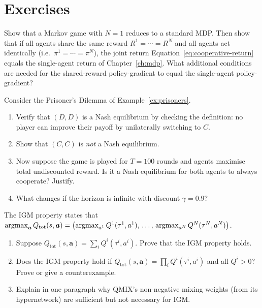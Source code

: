 \section*{Exercises}

\begin{exercise}
\label{ex:markov-game-reduction}
Show that a Markov game with $N=1$ reduces to a standard MDP.
Then show that if all agents share the same reward $R^1 = \cdots =
R^N$ and all agents act identically (i.e.\ $\pi^1 = \cdots = \pi^N$),
the joint return Equation~\eqref{eq:cooperative-return} equals the
single-agent return of Chapter~\ref{ch:mdp}. What additional
conditions are needed for the shared-reward policy-gradient to equal
the single-agent policy-gradient?
\end{exercise}

\begin{exercise}
\label{ex:nash-prisoners}
Consider the Prisoner's Dilemma of Example~\ref{ex:prisoners}.
\begin{enumerate}[label=(\alph*)]
  \item Verify that $(D, D)$ is a Nash equilibrium by checking the
    definition: no player can improve their payoff by unilaterally
    switching to $C$.
  \item Show that $(C, C)$ is \emph{not} a Nash equilibrium.
  \item Now suppose the game is played for $T = 100$ rounds and
    agents maximise total undiscounted reward. Is it a Nash
    equilibrium for both agents to always cooperate? Justify.
  \item What changes if the horizon is infinite with discount
    $\gamma = 0.9$?
\end{enumerate}
\end{exercise}

\begin{exercise}
\label{ex:igm-proof}
The IGM property states that
$\operatorname*{argmax}_{\bm{a}} Q_\mathrm{tot}(s, \bm{a}) = \bigl(\operatorname*{argmax}_{a^1}
Q^1(\tau^1, a^1),\, \ldots,\, \operatorname*{argmax}_{a^N} Q^N(\tau^N,
a^N)\bigr)$.
\begin{enumerate}[label=(\alph*)]
  \item Suppose $Q_\mathrm{tot}(s, \bm{a}) = \sum_i Q^i(\tau^i,
    a^i)$. Prove that the IGM property holds.
  \item Does the IGM property hold if
    $Q_\mathrm{tot}(s, \bm{a}) = \prod_i Q^i(\tau^i, a^i)$ and
    all $Q^i > 0$? Prove or give a counterexample.
  \item Explain in one paragraph why QMIX's non-negative mixing
    weights (from its hypernetwork) are sufficient but not necessary
    for IGM.
\end{enumerate}
\end{exercise}

